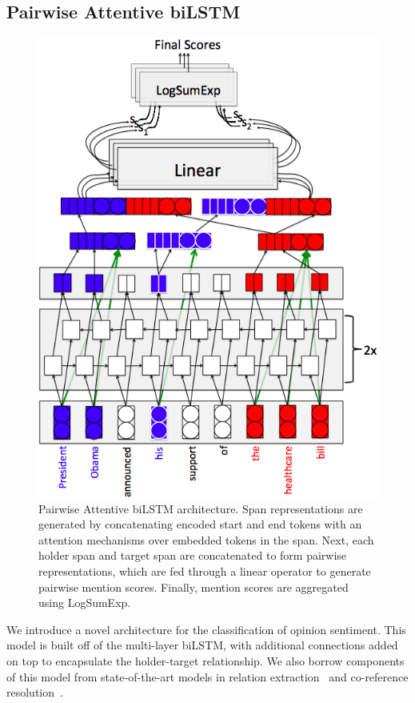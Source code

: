\documentclass[11pt,a4paper]{article}
\begin{document}
\subsection{Pairwise Attentive biLSTM}
\begin{figure} \label{fig:intro}
\centering
\includegraphics[scale=0.4]{adv.png}
\caption{Pairwise Attentive biLSTM architecture. Span representations are generated by concatenating encoded start and end tokens with an attention mechanisms over embedded tokens in the span. Next, each holder span and target span are concatenated to form pairwise representations, which are fed through a linear operator to generate pairwise mention scores. Finally, mention scores are aggregated using LogSumExp.}
\end{figure}

We introduce a novel architecture for the classification of opinion sentiment.
This model is built off of the multi-layer biLSTM, with additional connections added on top to encapsulate the holder-target relationship.
We also borrow components of this model from state-of-the-art models in relation extraction~\cite{Verga:18} and co-reference resolution~\cite{Lee:17}.
\end{document}
